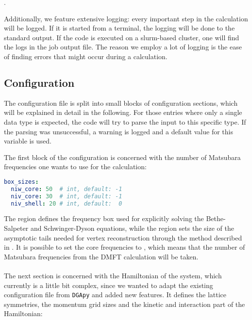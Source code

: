 \documentclass[\main/main.tex]{subfiles}
\begin{document}
\mbox{}.

Additionally, we feature extensive logging: every important step in the calculation will be logged. If it is started from a terminal, the logging will be done to the standard output. If the code is executed on a slurm-based cluster, one will find the logs in the job output file. The reason we employ a lot of logging is the ease of finding errors that might occur during a calculation.

\subsection{Configuration}

The configuration file is split into small blocks of configuration sections, which will be explained in detail in the following. For those entries where only a single data type is expected, the code will try to parse the input to this specific type. If the parsing was unsuccessful, a warning is logged and a default value for this variable is used. 

The first block of the configuration is concerned with the number of Matsubara frequencies one wants to use for the calculation:

\begin{minipage}{\textwidth}%
\begin{lstlisting}[language=yaml]
box_sizes:
  niw_core: 50  # int, default: -1
  niv_core: 30  # int, default: -1
  niv_shell: 20 # int, default:  0
\end{lstlisting}
\end{minipage}
The  region defines the frequency box used for explicitly solving the Bethe-Salpeter and Schwinger-Dyson equations, while the  region sets the size of the asymptotic tails needed for vertex reconstruction through the method described in . It is possible to set the core frequencies to , which means that the number of Matsubara frequencies from the DMFT calculation will be taken.
\\\\
The next section is concerned with the Hamiltonian of the system, which currently is a little bit complex, since we wanted to adapt the existing configuration file from \texttt{DGApy} and added new features. It defines the lattice symmetries, the momentum grid sizes and the kinetic and interaction part of the Hamiltonian:
\end{document}
